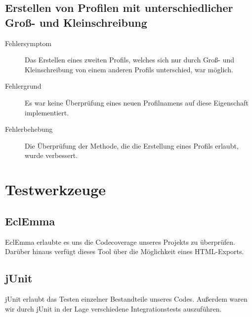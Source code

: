 \documentclass[parskip=full]{scrreprt}
\begin{document}
\section{Erstellen von Profilen mit unterschiedlicher Groß- und Kleinschreibung}
\begin{description}
	\item[Fehlersymptom] Das Erstellen eines zweiten Profils, welches sich nur durch Groß- und Kleinschreibung von einem anderen Profils unterschied, war möglich.
	\item[Fehlergrund] Es war keine Überprüfung eines neuen Profilnamens auf diese Eigenschaft implementiert.
	\item[Fehlerbehebung] Die Überprüfung der Methode, die die Erstellung eines Profils erlaubt, wurde verbessert.
\end{description}

\chapter{Testwerkzeuge}

\section{EclEmma}

EclEmma erlaubte es uns die Codecoverage unseres Projekts zu überprüfen. Darüber hinaus verfügt dieses Tool über die Möglichkeit eines HTML-Exports.

\section{jUnit}

jUnit erlaubt das Testen einzelner Bestandteile unseres Codes. Außerdem waren wir durch jUnit in der Lage verschiedene Integrationstests auszuführen.
\end{document}
